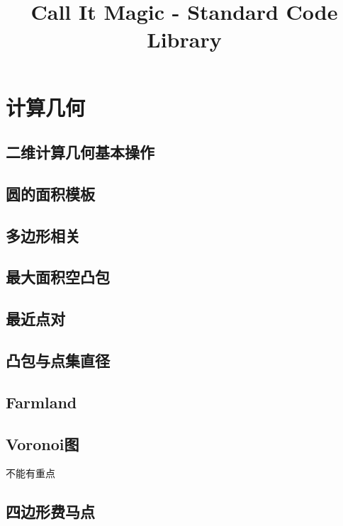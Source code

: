\documentclass[landscape, twocolumn, 8pt, a4paper, twoside]{extarticle}
\title{Call It Magic - Standard Code Library}
\begin{document}
\tableofcontents
\newpage

\section{计算几何}

  \subsection{二维计算几何基本操作}
    
    
  \subsection{圆的面积模板}
    

  \subsection{多边形相关}
    

  \subsection{最大面积空凸包}
    

  \subsection{最近点对}
    

  \subsection{凸包与点集直径}
    

  \subsection{Farmland}
    

  \subsection{Voronoi图}
    不能有重点
    

  \subsection{四边形费马点}
    
\end{document}
